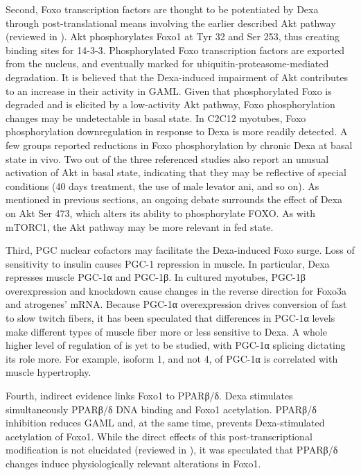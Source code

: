 \documentclass[12pt,english]{report}\usepackage[]{graphicx}\usepackage[]{color}
\begin{document}
Second, Foxo transcription factors are thought to be potentiated by
Dexa through post-translational means involving the earlier described
Akt pathway (reviewed in \citep{calnan2008foxo}). Akt phosphorylates
Foxo1 at Tyr 32 and Ser 253, thus creating binding sites for 14-3-3.
Phosphorylated Foxo transcription factors are exported from the nucleus,
and eventually marked for ubiquitin-proteasome-mediated degradation.
It is believed that the Dexa-induced impairment of Akt contributes
to an increase in their activity in GAML. Given that phosphorylated
Foxo is degraded and is elicited by a low-activity Akt pathway, Foxo
phosphorylation changes may be undetectable in basal state. In C2C12
myotubes, Foxo phosphorylation downregulation in response to Dexa
is more readily detected\citep{zhao2007foxo3,sandri2004foxo}. A few
groups reported reductions in Foxo phosphorylation by chronic Dexa
at basal state in vivo\citep{jones2010effects,fappi2014effects,jesinkey2014atomoxetine}.
Two out of the three referenced studies also report an unusual activation
of Akt in basal state, indicating that they may be reflective of special
conditions (40 days treatment, the use of male levator ani, and so
on). As mentioned in previous sections, an ongoing debate surrounds
the effect of Dexa on Akt Ser 473, which alters its ability to phosphorylate
FOXO. As with mTORC1, the Akt pathway may be more relevant in fed
state.

Third, PGC nuclear cofactors may facilitate the Dexa-induced Foxo
surge. Loss of sensitivity to insulin causes PGC-1 repression in muscle\citep{ling2004multiple}.
In particular, Dexa represses muscle PGC-1α\citep{qin2010protection,jesinkey2014atomoxetine}
and PGC-1β\citep{menconi2010sepsis}. In cultured myotubes, PGC-1β
overexpression and knockdown cause changes in the reverse direction
for Foxo3a and atrogenes' mRNA. Because PGC-1α overexpression drives
conversion of fast to slow twitch fibers\citep{lin2002transcriptional},
it has been speculated that differences in PGC-1α levels make different
types of muscle fiber more or less sensitive to Dexa\citep{schiaffino2013mechanisms}.
A whole higher level of regulation of is yet to be studied, with PGC-1α
splicing dictating its role more. For example, isoform 1, and not
4, of PGC-1α is correlated with muscle hypertrophy\citep{ruas2012pgc-1alpha}.

Fourth, indirect evidence links Foxo1 to PPARβ/δ. Dexa stimulates
simultaneously PPARβ/δ DNA binding and Foxo1 acetylation\citep{castillero2013ppar/}.
PPARβ/δ inhibition reduces GAML and, at the same time, prevents Dexa-stimulated
acetylation of Foxo1. While the direct effects of this post-transcriptional
modification is not elucidated (reviewed in \citep{daitoku2011regulation,nakae2008foxo}),
it was speculated that PPARβ/δ changes induce physiologically relevant
alterations in Foxo1.
\end{document}
